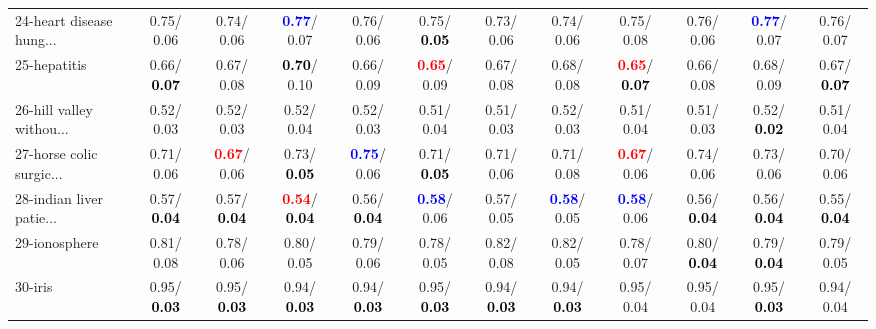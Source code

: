 \begin{table}[h]
\begin{center}
{\begin{tabular}{lc|c|c|c|c|c|c|c|c|c|c}
24-heart disease hung... &   0.75/  0.06 &   0.74/  0.06 & \textcolor{blue}{\textbf{  0.77}}/  0.07 &   0.76/  0.06 &   0.75/\textcolor{black}{\textbf{  0.05}} &   0.73/  0.06 &   0.74/  0.06 &   0.75/  0.08 &   0.76/  0.06 & \textcolor{blue}{\textbf{  0.77}}/  0.07 &   0.76/  0.07 \\
25-hepatitis &   0.66/\textcolor{black}{\textbf{  0.07}} &   0.67/  0.08 & \textcolor{black}{\textbf{  0.70}}/  0.10 &   0.66/  0.09 & \textcolor{red}{\textbf{  0.65}}/  0.09 &   0.67/  0.08 &   0.68/  0.08 & \textcolor{red}{\textbf{  0.65}}/\textcolor{black}{\textbf{  0.07}} &   0.66/  0.08 &   0.68/  0.09 &   0.67/\textcolor{black}{\textbf{  0.07}} \\
26-hill valley withou... &   0.52/  0.03 &   0.52/  0.03 &   0.52/  0.04 &   0.52/  0.03 &   0.51/  0.04 &   0.51/  0.03 &   0.52/  0.03 &   0.51/  0.04 &   0.51/  0.03 &   0.52/\textcolor{black}{\textbf{  0.02}} &   0.51/  0.04 \\
27-horse colic surgic... &   0.71/  0.06 & \textcolor{red}{\textbf{  0.67}}/  0.06 &   0.73/\textcolor{black}{\textbf{  0.05}} & \textcolor{blue}{\textbf{  0.75}}/  0.06 &   0.71/\textcolor{black}{\textbf{  0.05}} &   0.71/  0.06 &   0.71/  0.08 & \textcolor{red}{\textbf{  0.67}}/  0.06 &   0.74/  0.06 &   0.73/  0.06 &   0.70/  0.06 \\
28-indian liver patie... &   0.57/\textcolor{black}{\textbf{  0.04}} &   0.57/\textcolor{black}{\textbf{  0.04}} & \textcolor{red}{\textbf{  0.54}}/\textcolor{black}{\textbf{  0.04}} &   0.56/\textcolor{black}{\textbf{  0.04}} & \textcolor{blue}{\textbf{  0.58}}/  0.06 &   0.57/  0.05 & \textcolor{blue}{\textbf{  0.58}}/  0.05 & \textcolor{blue}{\textbf{  0.58}}/  0.06 &   0.56/\textcolor{black}{\textbf{  0.04}} &   0.56/\textcolor{black}{\textbf{  0.04}} &   0.55/\textcolor{black}{\textbf{  0.04}} \\ \hline
29-ionosphere &   0.81/  0.08 &   0.78/  0.06 &   0.80/  0.05 &   0.79/  0.06 &   0.78/  0.05 &   0.82/  0.08 &   0.82/  0.05 &   0.78/  0.07 &   0.80/\textcolor{black}{\textbf{  0.04}} &   0.79/\textcolor{black}{\textbf{  0.04}} &   0.79/  0.05 \\
30-iris &   0.95/\textcolor{black}{\textbf{  0.03}} &   0.95/\textcolor{black}{\textbf{  0.03}} &   0.94/\textcolor{black}{\textbf{  0.03}} &   0.94/\textcolor{black}{\textbf{  0.03}} &   0.95/\textcolor{black}{\textbf{  0.03}} &   0.94/\textcolor{black}{\textbf{  0.03}} &   0.94/\textcolor{black}{\textbf{  0.03}} &   0.95/  0.04 &   0.95/  0.04 &   0.95/\textcolor{black}{\textbf{  0.03}} &   0.94/  0.04 \\

\end{tabular}}
\end{center}
\end{table}
